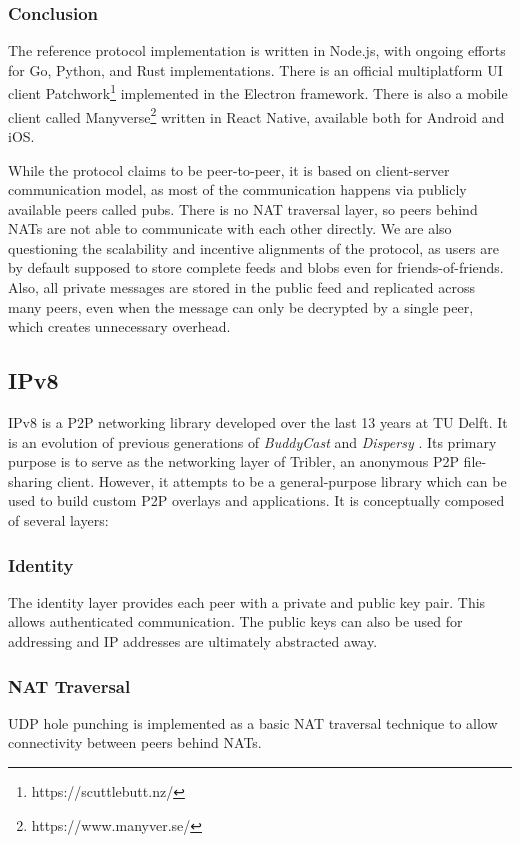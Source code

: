 \subsubsection{Conclusion}

The reference protocol implementation is written in Node.js, with ongoing efforts for Go, Python, and Rust implementations. There is an official multiplatform UI client Patchwork\footnote{https://scuttlebutt.nz/} implemented in the Electron framework. There is also a mobile client called Manyverse\footnote{https://www.manyver.se/} written in React Native, available both for Android and iOS.

While the protocol claims to be peer-to-peer, it is based on client-server communication model, as most of the communication happens via publicly available peers called pubs. There is no NAT traversal layer, so peers behind NATs are not able to communicate with each other directly. We are also questioning the scalability and incentive alignments of the protocol, as users are by default supposed to store complete feeds and blobs even for friends-of-friends. Also, all private messages are stored in the public feed and replicated across many peers, even when the message can only be decrypted by a single peer, which creates unnecessary overhead.

\subsection{IPv8}

IPv8 \cite{ipv8} is a P2P networking library developed over the last 13 years at TU Delft. It is an evolution of previous generations of \textit{BuddyCast} \cite{buddycast} and \textit{Dispersy} \cite{dispersy}. Its primary purpose is to serve as the networking layer of Tribler, an anonymous P2P file-sharing client. However, it attempts to be a general-purpose library which can be used to build custom P2P overlays and applications. It is conceptually composed of several layers:

\subsubsection{Identity}
The identity layer provides each peer with a private and public key pair. This allows authenticated communication. The public keys can also be used for addressing and IP addresses are ultimately abstracted away.

\subsubsection{NAT Traversal}
UDP hole punching is implemented as a basic NAT traversal technique to allow connectivity between peers behind NATs.

